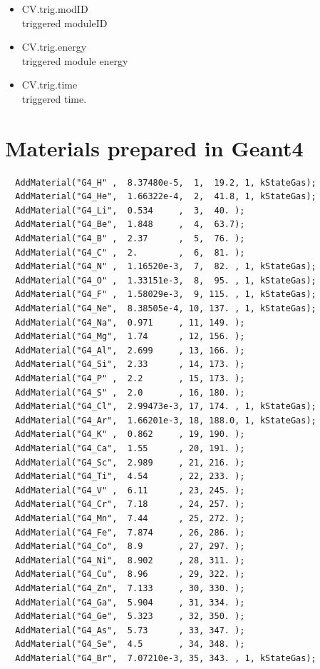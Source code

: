 \documentclass[a4paper,12pt]{article}
\begin{document}
    \begin{itemize}
     \item CV.trig.modID\\
	   triggered moduleID
     \item CV.trig.energy\\
	   triggered module energy
     \item CV.trig.time\\
	   triggered time.
    \end{itemize}
    
 \newpage
 \appendix
 \section{Materials prepared in Geant4\label{app:mat}}
 \begin{verbatim}
  AddMaterial("G4_H" ,  8.37480e-5,  1,  19.2, 1, kStateGas);
  AddMaterial("G4_He",  1.66322e-4,  2,  41.8, 1, kStateGas);
  AddMaterial("G4_Li",  0.534     ,  3,  40. );
  AddMaterial("G4_Be",  1.848     ,  4,  63.7);
  AddMaterial("G4_B" ,  2.37      ,  5,  76. );
  AddMaterial("G4_C" ,  2.        ,  6,  81. );
  AddMaterial("G4_N" ,  1.16520e-3,  7,  82. , 1, kStateGas);
  AddMaterial("G4_O" ,  1.33151e-3,  8,  95. , 1, kStateGas);
  AddMaterial("G4_F" ,  1.58029e-3,  9, 115. , 1, kStateGas);
  AddMaterial("G4_Ne",  8.38505e-4, 10, 137. , 1, kStateGas);
  AddMaterial("G4_Na",  0.971     , 11, 149. );
  AddMaterial("G4_Mg",  1.74      , 12, 156. );
  AddMaterial("G4_Al",  2.699     , 13, 166. );
  AddMaterial("G4_Si",  2.33      , 14, 173. );
  AddMaterial("G4_P" ,  2.2       , 15, 173. );
  AddMaterial("G4_S" ,  2.0       , 16, 180. );
  AddMaterial("G4_Cl",  2.99473e-3, 17, 174. , 1, kStateGas);
  AddMaterial("G4_Ar",  1.66201e-3, 18, 188.0, 1, kStateGas);
  AddMaterial("G4_K" ,  0.862     , 19, 190. );
  AddMaterial("G4_Ca",  1.55      , 20, 191. );
  AddMaterial("G4_Sc",  2.989     , 21, 216. );
  AddMaterial("G4_Ti",  4.54      , 22, 233. );
  AddMaterial("G4_V" ,  6.11      , 23, 245. );
  AddMaterial("G4_Cr",  7.18      , 24, 257. );
  AddMaterial("G4_Mn",  7.44      , 25, 272. );
  AddMaterial("G4_Fe",  7.874     , 26, 286. );
  AddMaterial("G4_Co",  8.9       , 27, 297. );
  AddMaterial("G4_Ni",  8.902     , 28, 311. );
  AddMaterial("G4_Cu",  8.96      , 29, 322. );
  AddMaterial("G4_Zn",  7.133     , 30, 330. );
  AddMaterial("G4_Ga",  5.904     , 31, 334. );
  AddMaterial("G4_Ge",  5.323     , 32, 350. );
  AddMaterial("G4_As",  5.73      , 33, 347. );
  AddMaterial("G4_Se",  4.5       , 34, 348. );
  AddMaterial("G4_Br",  7.07210e-3, 35, 343. , 1, kStateGas);

\end{verbatim}
\end{document}
